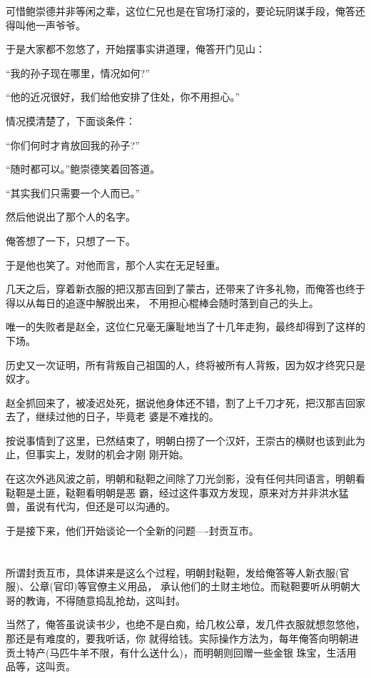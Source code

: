 \documentclass[11pt,a4paper,onecolumn]{article}
\begin{document}
可惜鲍崇德并非等闲之辈，这位仁兄也是在官场打滚的，要论玩阴谋手段，俺答还得叫他一声爷爷。

于是大家都不忽悠了，开始摆事实讲道理，俺答开门见山：

``我的孙子现在哪里，情况如何?''

``他的近况很好，我们给他安排了住处，你不用担心。''

情况摸清楚了，下面谈条件：

``你们何时才肯放回我的孙子?''

``随时都可以。''鲍崇德笑着回答道。

``其实我们只需要一个人而已。''

然后他说出了那个人的名字。

俺答想了一下，只想了一下。

于是他也笑了。对他而言，那个人实在无足轻重。

几天之后，穿着新衣服的把汉那吉回到了蒙古，还带来了许多礼物，而俺答也终于得以从每日的追逐中解脱出来，
不用担心棍棒会随时落到自己的头上。

唯一的失败者是赵全，这位仁兄毫无廉耻地当了十几年走狗，最终却得到了这样的下场。

历史又一次证明，所有背叛自己祖国的人，终将被所有人背叛，因为奴才终究只是奴才。

赵全抓回来了，被凌迟处死，据说他身体还不错，割了上千刀才死，把汉那吉回家去了，继续过他的日子，毕竟老
婆是不难找的。

按说事情到了这里，已然结束了，明朝白捞了一个汉奸，王崇古的横财也该到此为止，但事实上，发财的机会才刚
刚开始。

在这次外逃风波之前，明朝和鞑靼之间除了刀光剑影，没有任何共同语言，明朝看鞑靼是土匪，鞑靼看明朝是恶
霸，经过这件事双方发现，原来对方并非洪水猛兽，虽说有代沟，但还是可以沟通的。

于是接下来，他们开始谈论一个全新的问题----封贡互市。

\section[\thesection]{}

所谓封贡互市，具体讲来是这么个过程，明朝封鞑靼，发给俺答等人新衣服(官服)、公章(官印)等官僚主义用品，
承认他们的土财主地位。而鞑靼要听从明朝大哥的教诲，不得随意捣乱抢劫，这叫封。

当然了，俺答虽说读书少，也绝不是白痴，给几枚公章，发几件衣服就想忽悠他，那还是有难度的，要我听话，你
就得给钱。实际操作方法为，每年俺答向明朝进贡土特产(马匹牛羊不限，有什么送什么)，而明朝则回赠一些金银
珠宝，生活用品等，这叫贡。
\end{document}
